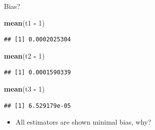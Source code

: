 \documentclass[
  ignorenonframetext,
]{beamer}
\newenvironment{Shaded}{\begin{snugshade}}{\end{snugshade}}
\newcommand{\DecValTok}[1]{\textcolor[rgb]{0.00,0.00,0.81}{#1}}
\newcommand{\FunctionTok}[1]{\textcolor[rgb]{0.13,0.29,0.53}{\textbf{#1}}}
\newcommand{\NormalTok}[1]{#1}
\newcommand{\SpecialCharTok}[1]{\textcolor[rgb]{0.81,0.36,0.00}{\textbf{#1}}}
\providecommand{\tightlist}{%
  \setlength{\itemsep}{0pt}\setlength{\parskip}{0pt}}
\begin{document}
\begin{frame}[fragile]{Bias?}
\protect{}\label{bias}
\begin{Shaded}
\begin{Highlighting}[]
\FunctionTok{mean}\NormalTok{(t1 }\SpecialCharTok{{-}} \DecValTok{1}\NormalTok{)}
\end{Highlighting}
\end{Shaded}

\begin{verbatim}
## [1] 0.0002025304
\end{verbatim}

\begin{Shaded}
\begin{Highlighting}[]
\FunctionTok{mean}\NormalTok{(t2 }\SpecialCharTok{{-}} \DecValTok{1}\NormalTok{)}
\end{Highlighting}
\end{Shaded}

\begin{verbatim}
## [1] 0.0001590339
\end{verbatim}

\begin{Shaded}
\begin{Highlighting}[]
\FunctionTok{mean}\NormalTok{(t3 }\SpecialCharTok{{-}} \DecValTok{1}\NormalTok{)}
\end{Highlighting}
\end{Shaded}

\begin{verbatim}
## [1] 6.529179e-05
\end{verbatim}

\begin{itemize}
\tightlist
\item
  All estimators are shown minimal bias, why?
\end{itemize}
\end{frame}
\end{document}
